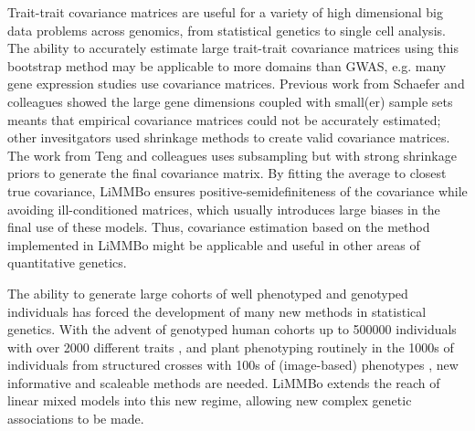 Trait-trait covariance matrices are useful for a variety of high dimensional big data problems across genomics, from statistical genetics to single cell analysis. The ability to accurately estimate large trait-trait covariance matrices using this bootstrap method may be applicable to more domains than GWAS, e.g. many gene expression studies use covariance matrices. Previous work from Schaefer and colleagues \cite{Schafer2005} showed the large gene dimensions coupled with small(er) sample sets meants that empirical covariance matrices could not be accurately estimated; other invesitgators \cite{Ledoit2004,Furrer2007,Bickel2008} used shrinkage methods to create valid covariance matrices. The work from Teng and colleagues \cite{Teng2009} uses subsampling but with strong shrinkage priors to generate the final covariance matrix. By fitting the average to closest true covariance, LiMMBo ensures positive-semidefiniteness of the covariance while avoiding ill-conditioned matrices, which usually introduces large biases in the final use of these models. Thus, covariance estimation based on the method implemented in LiMMBo might be applicable and useful in other areas of quantitative genetics.  

The ability to generate large cohorts of well phenotyped and genotyped individuals has forced the development of many new methods in statistical genetics. With the advent of genotyped human cohorts up to \num{500000} individuals with over \num{2000} different traits \citep{Sudlow2015}, and plant phenotyping routinely in the \num{1000}s of individuals from structured crosses with \num{100}s of (image-based) phenotypes \citep{Atwell2010} , new informative and scaleable methods are needed. LiMMBo extends the reach of linear mixed models into this new regime, allowing new complex genetic associations to be made.
